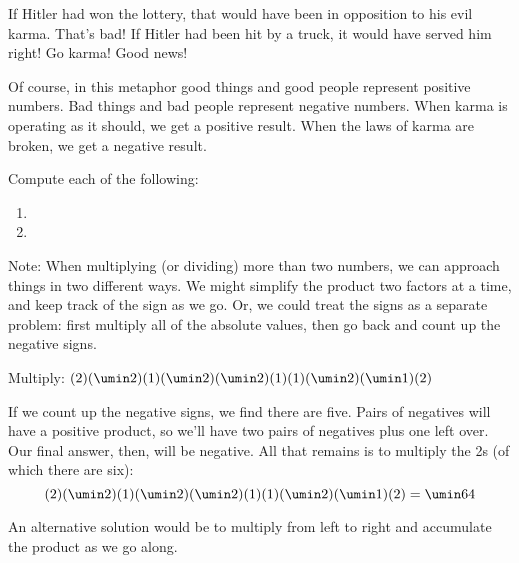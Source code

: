 If Hitler had won the lottery, that would have been in opposition to his evil karma. That's bad! If Hitler had been hit by a truck, it would have served him right! Go karma! Good news! 

Of course, in this metaphor good things and good people represent positive numbers. Bad things and bad people represent negative numbers. When karma is operating as it should, we get a positive result. When the laws of karma are broken, we get a negative result.

\begin{boxedex}
Compute each of the following:

\begin{enumerate}[itemsep=10pt]
\item {}

\item {}
\end{enumerate}
\end{boxedex}

Note: When multiplying (or dividing) more than two numbers, we can approach things in two different ways. We might simplify the product two factors at a time, and keep track of the sign as we go. Or, we could treat the signs as a separate problem: first multiply all of the absolute values, then go back and count up the negative signs. %

\begin{boxedex}
Multiply: $(2)(\umin2)(1)(\umin2)(\umin2)(1)(1)(\umin2)(\umin1)(2)$

\exsoln{} If we count up the negative signs, we find there are five. Pairs of negatives will have a positive product, so we'll have two pairs of negatives plus one left over. Our final answer, then, will be negative. All that remains is to multiply the 2s (of which there are six): \[(2)(\umin2)(1)(\umin2)(\umin2)(1)(1)(\umin2)(\umin1)(2) = \umin64\]

An alternative solution would be to multiply from left to right and accumulate the product as we go along.
\end{boxedex}


